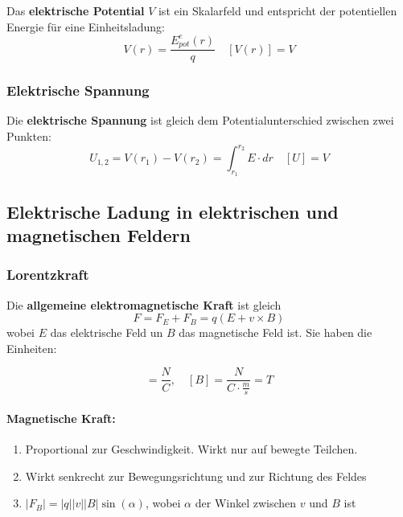 \documentclass[7pt]{article}
\begin{document}
\begin{multicols*}{3}
Das \textbf{elektrische Potential} $V$ ist ein Skalarfeld und entspricht der potentiellen Energie f{\"u}r eine Einheitsladung:
\begin{equation*}
	V(r) = \frac{E^e_{pot}(r)}{q} \quad [V(r)] = V
\end{equation*}

\subsubsection{Elektrische Spannung}

Die \textbf{elektrische Spannung} ist gleich dem Potentialunterschied zwischen zwei Punkten:
\begin{equation*}
	U_{1,2} = V(r_1)-V(r_2) = \int_{r_1}^{r_2}E\cdot dr \quad [U] = V
\end{equation*}

\subsection{Elektrische Ladung in elektrischen und magnetischen Feldern}

\subsubsection{Lorentzkraft}

Die \textbf{allgemeine elektromagnetische Kraft} ist gleich
\begin{equation*}
	F = F_E + F_B = q(E + v\times B)
\end{equation*}
wobei $E$ das elektrische Feld un $B$ das magnetische Feld ist. Sie haben die Einheiten:

\begin{equation*}
	[E] = \frac{N}{C},\quad [B] = \frac{N}{C\cdot \frac{m}{s}} = T
\end{equation*}

\paragraph{Magnetische Kraft:}
\begin{enumerate}
	\item Proportional zur Geschwindigkeit. Wirkt nur auf bewegte Teilchen.
	\item Wirkt senkrecht zur Bewegungsrichtung und zur Richtung des Feldes
	\item $|F_B| = |q||v||B|\sin(\alpha)$, wobei $\alpha$ der Winkel zwischen $v$ und $B$ ist
\end{enumerate}


\end{multicols*}
\end{document}

